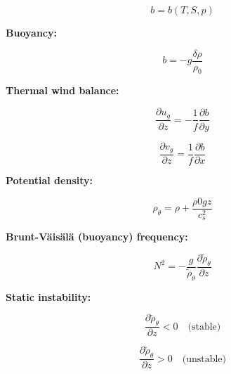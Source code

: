 \documentclass[12pt]{article}
\numberwithin{equation}{section}
\numberwithin{figure}{section}
\numberwithin{table}{section}
\begin{document}
\begin{equation}
  b = b(T, S, p)
\end{equation}

\textbf{Buoyancy:}

\begin{equation}
  b = - g \frac{\delta \rho}{\rho_0}
\end{equation}

\textbf{Thermal wind balance:}

\begin{equation}
  \frac{\partial u_g}{\partial z} = - \frac{1}{f} \frac{\partial b}{\partial y}
\end{equation}

\begin{equation}
  \frac{\partial v_g}{\partial z} = \frac{1}{f} \frac{\partial b}{\partial x}
\end{equation}

\textbf{Potential density:}

\begin{equation}
  \rho_\theta = \rho + \frac{\rho0 g z}{c_s^2}
\end{equation}

\textbf{Brunt-Väisälä (buoyancy) frequency:}

\begin{equation}
  N^2 = - \frac{g}{\widetilde{\rho}_\theta} \frac{\partial \widetilde{\rho}_\theta}{\partial z}
\end{equation}

\textbf{Static instability:}

\begin{equation}
  \frac{\partial \widetilde{\rho}_\theta}{\partial z} < 0 \quad \text{(stable)}
\end{equation}

\begin{equation}
  \frac{\partial \widetilde{\rho}_\theta}{\partial z} > 0 \quad \text{(unstable)}
\end{equation}

\printindex
\end{document}
